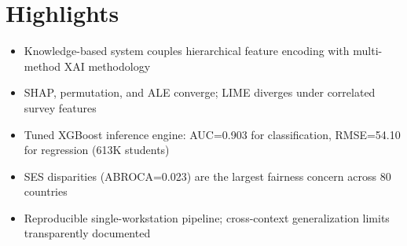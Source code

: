 \documentclass[12pt]{article}
\begin{document}
\section*{Highlights}

\begin{itemize}
  \item Knowledge-based system couples hierarchical feature encoding with multi-method XAI methodology
  \item SHAP, permutation, and ALE converge; LIME diverges under correlated survey features
  \item Tuned XGBoost inference engine: AUC=0.903 for classification, RMSE=54.10 for regression (613K students)
  \item SES disparities (ABROCA=0.023) are the largest fairness concern across 80 countries
  \item Reproducible single-workstation pipeline; cross-context generalization limits transparently documented
\end{itemize}
\end{document}
